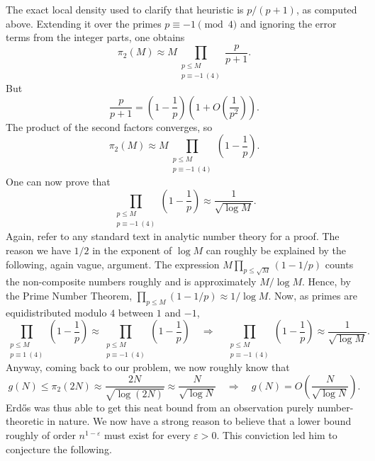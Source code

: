 \documentclass[11pt,a4paper]{article}
\begin{document}
The exact local density used to clarify that heuristic is $p/(p+1)$, as
computed above. Extending it over the primes $p\equiv-1\pmod4$ and ignoring
the error terms from the integer parts, one obtains
\[
 \pi_2(M)\approx
 M\prod_{\substack{p\le M\\p\equiv-1\ (4)}}\frac p{p+1}.
\]
But
\[
 \frac p{p+1}=\left(1-\frac1p\right)
 \left(1+O\left(\frac1{p^2}\right)\right).
\]
The product of the second factors converges, so
\[
 \pi_2(M)\approx
 M\prod_{\substack{p\le M\\p\equiv-1\ (4)}}
 \left(1-\frac1p\right).
\]
One can now prove that
\[
 \prod_{\substack{p\le M\\p\equiv-1\ (4)}}
 \left(1-\frac1p\right)
 \approx\frac1{\sqrt{\log M}}.
\]
Again, refer to any standard text in analytic number theory for a proof.
The reason we have $1/2$ in the exponent of $\log M$ can roughly be
explained by the following, again vague, argument.
The expression $M\prod_{p\le\sqrt M}(1-1/p)$ counts the non-composite
numbers roughly and is approximately $M/\log M$. Hence, by the Prime Number Theorem,
$\prod_{p\le M}(1-1/p)\approx1/\log M$.
Now, as primes are equidistributed modulo $4$ between $1$ and $-1$,
\[
 \prod_{\substack{p\le M\\p\equiv1\ (4)}}\left(1-\frac1p\right)
 \approx
 \prod_{\substack{p\le M\\p\equiv-1\ (4)}}\left(1-\frac1p\right)
 \quad\Longrightarrow\quad
 \prod_{\substack{p\le M\\p\equiv-1\ (4)}}\left(1-\frac1p\right)
 \approx\frac1{\sqrt{\log M}}.
\]
Anyway, coming back to our problem, we now roughly know that
\[
 g(N)\le \pi_2(2N)\approx\frac{2N}{\sqrt{\log(2N)}}
 \approx\frac N{\sqrt{\log N}}
 \quad\Longrightarrow\quad
 g(N)=O\left(\frac N{\sqrt{\log N}}\right).
\]
Erd\H{o}s was thus able to get this neat bound from an observation purely
number-theoretic in nature. We now have a strong reason to believe that a
lower bound roughly of order $n^{1-\varepsilon}$ must exist for every
$\varepsilon>0$. This conviction led him to conjecture the following.
\end{document}
